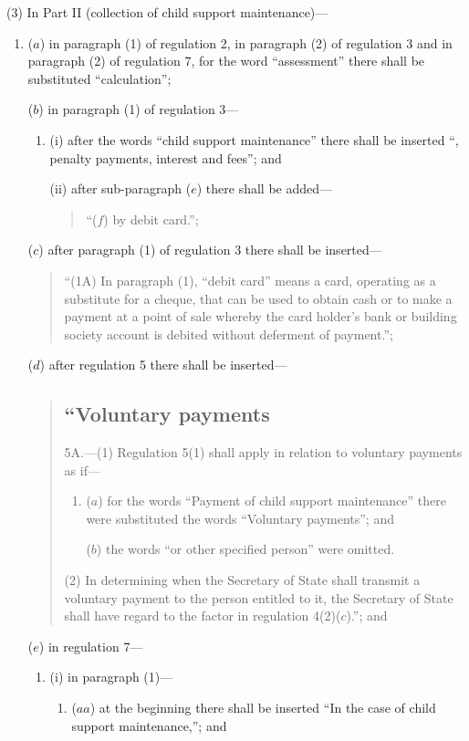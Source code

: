 \documentclass[12pt,a4paper]{article}
\begin{document}
(3) In Part II (collection of child support maintenance)—
\begin{enumerate}\item[]
($a$) in paragraph (1) of regulation 2, in paragraph (2) of regulation 3 and in paragraph (2) of regulation 7, for the word “assessment” there shall be substituted “calculation”;

($b$) in paragraph (1) of regulation 3—
\begin{enumerate}\item[]
(i) after the words “child support maintenance” there shall be inserted “, penalty payments, interest and fees”; and

(ii) after sub-paragraph ($e$)  there shall be added—
\begin{quotation}
“($f$) by debit card.”;
\end{quotation}
\end{enumerate}

($c$) after paragraph (1) of regulation 3 there shall be inserted—
\begin{quotation}
“(1A) In paragraph (1), “debit card” means a card, operating as a substitute for a cheque, that can be used to obtain cash or to make a payment at a point of sale whereby the card holder’s bank or building society account is debited without deferment of payment.”;
\end{quotation}

($d$) after regulation 5 there shall be inserted—
\begin{quotation}
\subsection*{“Voluntary payments}

5A.---(1)  Regulation 5(1) shall apply in relation to voluntary payments as if—
\begin{enumerate}\item[]
($a$) for the words “Payment of child support maintenance” there were substituted the words “Voluntary payments”; and

($b$) the words “or other specified person” were omitted.
\end{enumerate}

(2) In determining when the Secretary of State shall transmit a voluntary payment to the person entitled to it, the Secretary of State shall have regard to the factor in regulation 4(2)($c$).”; and
\end{quotation}

($e$) in regulation 7—
\begin{enumerate}\item[]
(i) in paragraph (1)—
\begin{enumerate}\item[]
($aa$) at the beginning there shall be inserted “In the case of child support maintenance,”; and


\end{enumerate}
\end{enumerate}
\end{enumerate}
\end{document}
